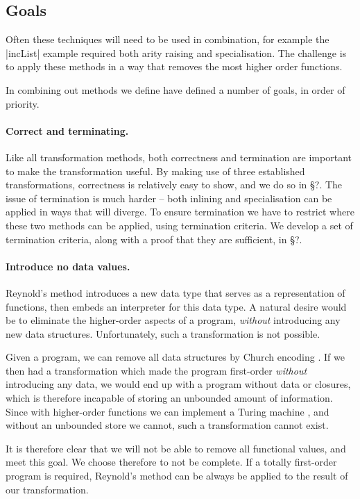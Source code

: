 \documentclass[preprint]{sigplanconf}
\begin{document}
\subsection{Goals}

Often these techniques will need to be used in combination, for example the |incList| example required both arity raising and specialisation. The challenge is to apply these methods in a way that removes the most higher order functions.

In combining out methods we define have defined a number of goals, in order of priority.

\paragraph{Correct and terminating.} Like all transformation methods, both correctness and termination are important to make the transformation useful. By making use of three established transformations, correctness is relatively easy to show, and we do so in \S?. The issue of termination is much harder -- both inlining and specialisation can be applied in ways that will diverge. To ensure termination we have to restrict where these two methods can be applied, using termination criteria. We develop a set of termination criteria, along with a proof that they are sufficient, in \S?.

\paragraph{Introduce no data values.} Reynold's method introduces a new data type that serves as a representation of functions, then embeds an interpreter for this data type. A natural desire would be to eliminate the higher-order aspects of a program, \textit{without} introducing any new data structures. Unfortunately, such a transformation is not possible.

Given a program, we can remove all data structures by Church encoding \cite{church_encode}. If we then had a transformation which made the program first-order \textit{without} introducing any data, we would end up with a program without data or closures, which is therefore incapable of storing an unbounded amount of information. Since with higher-order functions we can implement a Turing machine \cite{turing:halting}, and without an unbounded store we cannot, such a transformation cannot exist.

It is therefore clear that we will not be able to remove all functional values, and meet this goal. We choose therefore to not be complete. If a totally first-order program is required, Reynold's method can be always be applied to the result of our transformation.
\end{document}
